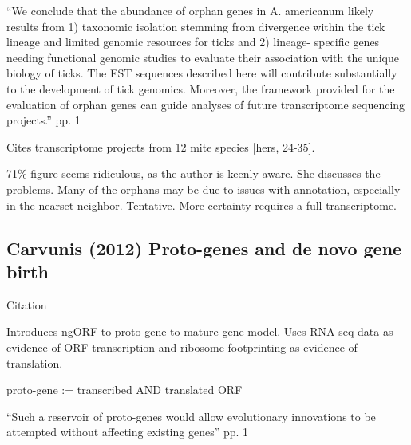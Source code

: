     ``We conclude that the abundance of orphan genes in A. americanum likely results
    from 1) taxonomic isolation stemming from divergence within the tick lineage
    and limited genomic resources for ticks and 2) lineage- specific genes needing
    functional genomic studies to evaluate their association with the unique
    biology of ticks.  The EST sequences described here will contribute
    substantially to the development of tick genomics. Moreover, the framework
    provided for the evaluation of orphan genes can guide analyses of future
    transcriptome sequencing projects.'' pp. 1

    Cites transcriptome projects from 12 mite species [hers, 24-35].

    71\% figure seems ridiculous, as the author is keenly aware. She discusses
    the problems. Many of the orphans may be due to issues with annotation,
    especially in the nearset neighbor. Tentative. More certainty requires a
    full transcriptome.

\subsection{Carvunis (2012) Proto-genes and de novo gene birth}

    Citation \cite{carvunis_proto-genes_2012}

    Introduces ngORF to proto-gene to mature gene model. Uses RNA-seq data
    as evidence of ORF transcription and ribosome footprinting as evidence
    of translation.

    proto-gene := transcribed AND translated ORF
    
    ``Such a reservoir of proto-genes would allow evolutionary innovations
    to be attempted without affecting existing genes'' pp. 1



